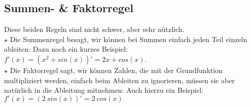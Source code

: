\subsection{Summen- \& Faktorregel}
	Diese beiden Regeln sind nicht schwer, aber sehr nützlich.\\

	\(\star\) Die Summenregel besagt, wir können bei Summen einfach jeden Teil
	einzeln ableiten:
	\formel{\[(f(x)+g(x))'=f'(x)+g'(x)\]}
	Dazu noch ein kurzes Beispiel: \(f'(x)=(x^2+sin(x))'=2x+cos(x)\).\\

	\(\star\) Die Faktorregel sagt, wir können Zahlen, die mit der Grundfunktion
	multipliziert werden, einfach beim Ableiten zu ignorieren, müssen sie aber
	natürlich in die Ableitung mitnehmen:
	\formel{\[f'(x)=(a\cdot g(x))'=a\cdot g'(x)\]}
	Auch hierzu ein Beispiel: \(f'(x)=(2\ sin(x))'=2\ cos(x)\)
